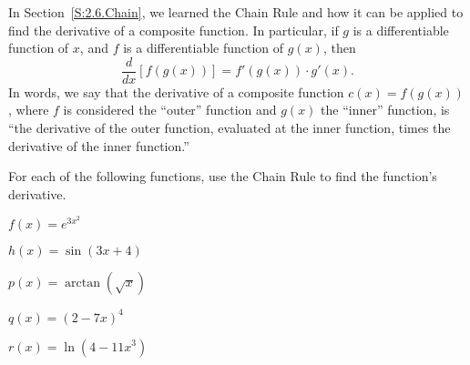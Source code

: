 \begin{pa} \label{PA:4.6}
In Section~\ref{S:2.6.Chain}, we learned the Chain Rule and how it can be applied to find the derivative of a composite function.  In particular, if $g$ is a differentiable function of $x$, and $f$ is a differentiable function of $g(x)$, then
$$\frac{d}{dx} \left[ f(g(x))  \right] = f'(g(x)) \cdot g'(x).$$
In words, we say that the derivative of a composite function $c(x) = f(g(x))$, where $f$ is considered the ``outer'' function and $g(x)$ the ``inner'' function, is ``the derivative of the outer function, evaluated at the inner function, times the derivative of the inner function.''  

For each of the following functions, use the Chain Rule to find the function's derivative.
\ba
\item $f(x) = e^{3x^2}$
\item $h(x) = \sin(3x + 4)$
\item $p(x) = \arctan\left( \sqrt{x} \right)$
\item $q(x) = (2-7x)^4$
\item $r(x) = \ln \left( 4-11x^3 \right)$
\ea
\end{pa} 
\afterpa